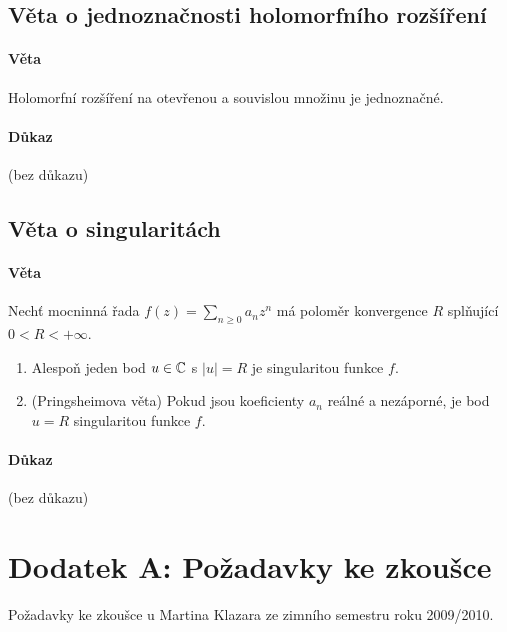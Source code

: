 \documentclass[a4paper,10pt]{article}
\begin{document}
\subsection{Věta o jednoznačnosti holomorfního rozšíření}
\label{veta-o-holomorf-roz}
\setcounter{equation}{0}
\paragraph{Věta}
Holomorfní rozšíření na otevřenou a souvislou množinu je jednoznačné.
\paragraph{Důkaz}
(bez důkazu)



\subsection{Věta o singularitách}
\label{veta-o-singularitach}
\setcounter{equation}{0}
\paragraph{Věta}
Nechť mocninná řada $f(z) = \sum_{n\ge 0} a_nz^n$ má poloměr konvergence $R$
splňující $0 < R < +\infty$.
\begin{enumerate}
	\item Alespoň jeden bod $u\in\mathbb{C}$ s $|u| = R$ je singularitou funkce $f$.
	\item (Pringsheimova věta) Pokud jsou koeficienty $a_n$ reálné a nezáporné,
	je bod $u = R$ singularitou funkce $f$.
\end{enumerate}
\paragraph{Důkaz}
(bez důkazu)






























\newpage
\section{Dodatek A: Požadavky ke zkoušce}
\setcounter{equation}{0}
Požadavky ke zkoušce u Martina Klazara ze zimního semestru roku 2009/2010.
\end{document}

